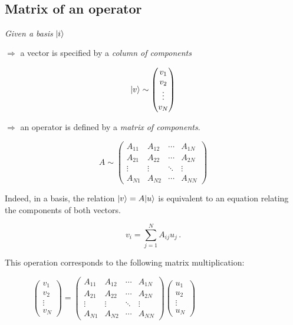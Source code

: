 \documentclass[11pt]{article}
\begin{document}
    \begin{center}
    \end{center}
    { \hspace*{\fill} \\}
    
    \subsection{Matrix of an operator}\label{matrix-of-an-operator}

    \emph{Given a basis} \(|i\rangle\)

\(\Rightarrow\) a vector is specified by a \emph{column of components}

\[
|v\rangle \sim \begin{pmatrix} v_1 \\ v_2\\ \vdots \\ v_N\end{pmatrix}
\]

    \(\Rightarrow\) an operator is defined by a \emph{matrix of components}.

\[
A \sim \begin{pmatrix} 
A_{11} & A_{12} & \cdots & A_{1N} \\
A_{21} & A_{22} & \cdots & A_{2N} \\
\vdots & \vdots &  \ddots      & \vdots \\
A_{N1} & A_{N2} &    \cdots    & A_{NN}
\end{pmatrix}
\]

    Indeed, in a basis, the relation \(|v\rangle = A|u\rangle\) is equivalent to
an equation relating the components of both vectors.

\[
v_i = \sum_{j=1}^N A_{ij} u_j  \, .
\]

    This operation corresponds to the following matrix multiplication:

\[
\begin{pmatrix}
v_1 \\ v_2 \\ \vdots \\ v_N \end{pmatrix} =  \begin{pmatrix} 
A_{11} & A_{12} & \cdots & A_{1N} \\
A_{21} & A_{22} & \cdots & A_{2N} \\
\vdots & \vdots &  \ddots      & \vdots \\
A_{N1} & A_{N2} &    \cdots    & A_{NN}
\end{pmatrix}
 \begin{pmatrix} 
u_1 \\ u_2 \\ \vdots \\ u_N\end{pmatrix} \hspace{4cm}
\]
\end{document}
